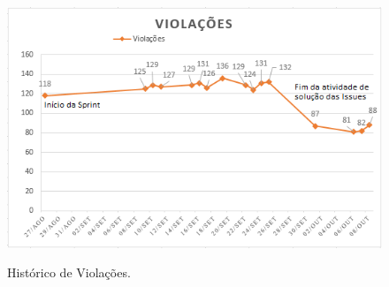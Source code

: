 \begin{figure}[H]
\centering 
\caption[Histórico de Violações]{Histórico de Violações.}\includegraphics[scale=0.9]{./images/histviolacoes2}
\label{fig:histissues}
\end{figure}	